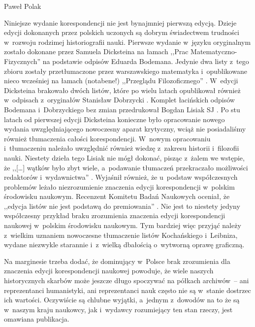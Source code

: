 \begin{recplenv}{Paweł Polak}
\enlargethispage{.5\baselineskip}

Niniejsze wydanie korespondencji nie jest bynajmniej pierwszą edycją. Dzieje edycji dokonanych przez polskich uczonych
są dobrym świadectwem trudności w~rozwoju rodzimej historiografii nauki. Pierwsze wydanie w~języku oryginalnym zostało
dokonane przez Samuela Dicksteina na łamach ,,Prac Matematyczno-Fizycznych''
\parencite{dickstein_korespondencya_1901,dickstein_korespondencya_1902}
na podstawie odpisów Eduarda Bodemana. Jedynie dwa listy z~tego zbioru zostały przetłumaczone przez
warszawskiego matematyka i~opublikowane nieco wcześniej na łamach (notabene!) ,,Przeglądu Filozoficznego''
\parencite{dickstein_wyjatek_1897}.
W~edycji Dicksteina brakowało dwóch listów, które po wielu latach
opublikował również w~odpisach z~oryginałów Stanisław Dobrzycki
\parencite*{dobrzycki_deux_1967}.
Komplet łacińskich
odpisów Bodemana i~Dobrzyckiego bez zmian przedrukował Bogdan Lisiak SJ
\parencite*{lisiak_korespondencja_2005}.
Po stu latach
od pierwszej edycji Dicksteina konieczne było opracowanie nowego wydania uwzględniającego nowoczesny aparat krytyczny,
wciąż nie posiadaliśmy również tłumaczenia całości korespondencji. W~nowym opracowaniu i~tłumaczeniu należało
uwzględnić również wiedzę z~zakresu historii i~filozofii nauki. Niestety dzieła tego Lisiak nie mógł dokonać, pisząc z~żalem
we wstępie, że ,,[…] wątków było zbyt wiele, a~podawanie tłumaczeń przekraczało możliwości redaktorów i~wydawnictwa''
\parencite[s.~9]{lisiak_korespondencja_2005}.
Wyjaśnił również, że u~podstaw współczesnych problemów
leżało niezrozumienie znaczenia edycji korespondencji w~polskim środowisku naukowym. Recenzent Komitetu Badań Naukowych
oceniał, że ,,edycja listów nie jest podstawą do premiowania''
\parencite[s.~10 {[przypis]}]{lisiak_korespondencja_2005}.
Nie jest to niestety jedyny współczesny przykład braku zrozumienia znaczenia edycji korespondencji naukowej w~polskim
środowisku naukowym. Tym bardziej więc przyjąć należy z~wielkim uznaniem nowoczesne tłumaczenie listów
Kochańskiego i~Leibniza, wydane niezwykle starannie i~z~wielką dbałością o~wytworną oprawę graficzną.

Na marginesie trzeba dodać, że dominujący w~Polsce brak zrozumienia dla znaczenia edycji korespondencji naukowej
powoduje, że wiele naszych historycznych skarbów może jeszcze długo spoczywać na półkach archiwów~-- ani reprezentanci
humanistyki, ani reprezentanci nauk często nie są w~stanie dostrzec ich wartości. Oczywiście są chlubne wyjątki, a~jednym z~dowodów
na to że są w~naszym kraju naukowcy, jak i~wydawcy rozumiejący ten stan rzeczy, jest omawiana
publikacja.


\end{recplenv}
